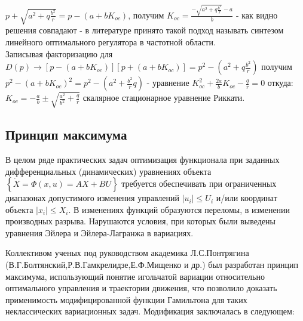 \documentclass[preprint,russian,a5paper,10pt,twoside,mediummath]{ncc}
\begin{document}
$p+\sqrt{{{a}^{2}}+q\frac{{{b}^{2}}}{r}}=p-\left( a+b{{K}_{oc}} \right)$, получим ${{K}_{oc}}=\frac{-\sqrt{{{a}^{2}}+q\frac{{{b}^{2}}}{r}}-a}{b}$ - как видно решения совпадают - в литературе принято такой подход называть синтезом линейного оптимального регулятора в частотной области.
\\Записывая факторизацию для $D\left( p \right)\to \left[ p-\left( a+b{{K}_{oc}} \right) \right]\left[ p+\left( a+b{{K}_{oc}} \right) \right]={{p}^{2}}-\left( {{a}^{2}}+q\frac{{{b}^{2}}}{r} \right)$ получим ${{p}^{2}}-{{\left( a+b{{K}_{oc}} \right)}^{2}}={{p}^{2}}-\left( {{a}^{2}}+\frac{{{b}^{2}}}{r}q \right)$ - уравнение $K_{oc}^{2}+\frac{2a}{b}{{K}_{oc}}-\frac{q}{r}=0$ откуда:  ${{K}_{oc}}=-\frac{a}{b}\pm \sqrt{\frac{{{a}^{2}}}{{{b}^{2}}}+\frac{q}{r}}$ скалярное стационарное уравнение Риккати.
\subsection{Принцип максимума\label{variations:Canonical_Euler}}
\par В целом ряде практических задач оптимизация функционала при заданных дифференциальных (динамических) уравнениях объекта $\left\{ \dot{X}=\Phi \left( x,u \right)=AX+BU \right\}$ требуется обеспечивать при ограниченных диапазонах допустимого изменения управлений $\left| {{u}_{i}} \right|\le {{U}_{i}}$   и/или координат объекта $\left| {{x}_{i}} \right|\le {{X}_{i}}$. В изменениях функций образуются переломы, в изменении производных разрыва. Нарушаются условия, при которых были выведены уравнения Эйлера и Эйлера-Лагранжа в вариациях.
\par Коллективом ученых под руководством академика Л.С.Понтрягина (В.Г.Болтянский,Р.В.Гамкрелидзе,Е.Ф.Мищенко и др.) был разработан принцип максимума, использующий понятие игольчатой вариации относительно оптимального управления и траектории движения, что позволило доказать применимость модифицированной функции Гамильтона для таких неклассических вариационных задач. Модификация заключалась в следующем:
\end{document}

